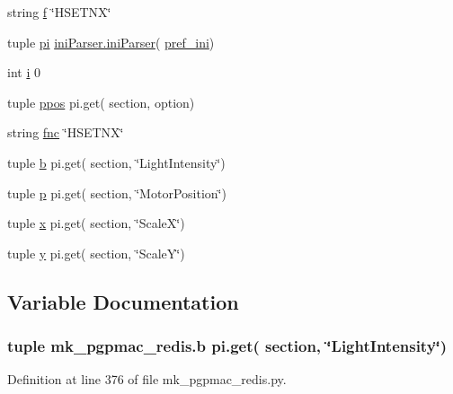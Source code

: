 \begin{DoxyCompactItemize}
string \hyperlink{namespacemk__pgpmac__redis_a057fe7457503e0de97edcf855591ed58}{f} \char`\"{}H\-S\-E\-T\-N\-X\char`\"{}
\item 
tuple \hyperlink{namespacemk__pgpmac__redis_a2f5bbda0250eecd94d166dc0a2fbff86}{pi} \hyperlink{classiniParser_1_1iniParser}{ini\-Parser.\-ini\-Parser}( \hyperlink{namespacemk__pgpmac__redis_a38c785af5201403976e1267c47ea5096}{pref\-\_\-ini})
\item 
int \hyperlink{namespacemk__pgpmac__redis_afa643a23a5984fe44c2182ada3dfa401}{i} 0
\item 
tuple \hyperlink{namespacemk__pgpmac__redis_aadd7321b8f7efe139c3e92e51cd34c00}{ppos} pi.\-get( section, option)
\item 
string \hyperlink{namespacemk__pgpmac__redis_a654b54ba0758b8b84516938260851129}{fnc} \char`\"{}H\-S\-E\-T\-N\-X\char`\"{}
\item 
tuple \hyperlink{namespacemk__pgpmac__redis_a90faa2042277e396b48b19374c9db4ab}{b} pi.\-get( section, \char`\"{}Light\-Intensity\char`\"{})
\item 
tuple \hyperlink{namespacemk__pgpmac__redis_a11daf2847f2dc94562b5b61b3f412574}{p} pi.\-get( section, \char`\"{}Motor\-Position\char`\"{})
\item 
tuple \hyperlink{namespacemk__pgpmac__redis_abc8696f6f2f3fd3edd30989d3c8ec301}{x} pi.\-get( section, \char`\"{}Scale\-X\char`\"{})
\item 
tuple \hyperlink{namespacemk__pgpmac__redis_a34220d58136fb95853f54ed51a130f79}{y} pi.\-get( section, \char`\"{}Scale\-Y\char`\"{})
\end{DoxyCompactItemize}


\subsection{Variable Documentation}
\hypertarget{namespacemk__pgpmac__redis_a90faa2042277e396b48b19374c9db4ab}{
\subsubsection[{b}]{\setlength{\rightskip}{0pt plus 5cm}tuple mk\-\_\-pgpmac\-\_\-redis.\-b pi.\-get( section, \char`\"{}Light\-Intensity\char`\"{})}}\label{namespacemk__pgpmac__redis_a90faa2042277e396b48b19374c9db4ab}


Definition at line 376 of file mk\-\_\-pgpmac\-\_\-redis.\-py.

